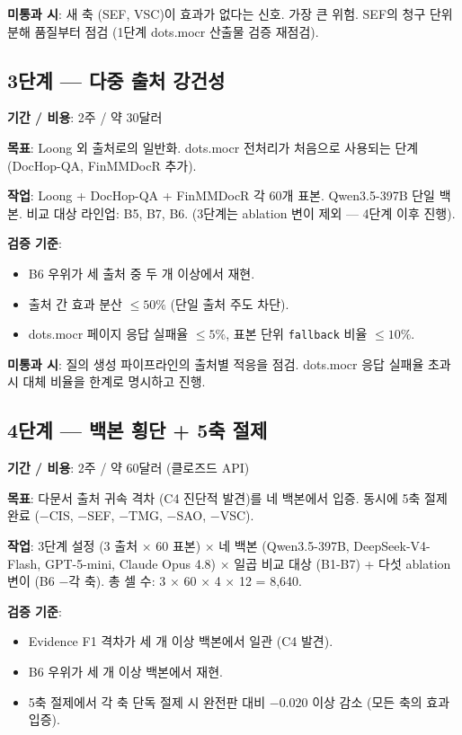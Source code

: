 \documentclass[11pt]{article}
\begin{document}
\textbf{미통과 시}: 새 축 (SEF, VSC)이 효과가 없다는 신호. 가장 큰 위험. SEF의 청구 단위 분해 품질부터 점검 (1단계 dots.mocr 산출물 검증 재점검).

\subsection{3단계 — 다중 출처 강건성}

\textbf{기간 / 비용}: 2주 / 약 30달러

\textbf{목표}: Loong 외 출처로의 일반화. dots.mocr 전처리가 처음으로 사용되는 단계 (DocHop-QA, FinMMDocR 추가).

\textbf{작업}: Loong + DocHop-QA + FinMMDocR 각 60개 표본. Qwen3.5-397B 단일 백본. 비교 대상 라인업: B5, B7, B6. (3단계는 ablation 변이 제외 — 4단계 이후 진행).

\textbf{검증 기준}:
\begin{itemize}[leftmargin=*]
    \item B6 우위가 세 출처 중 두 개 이상에서 재현.
    \item 출처 간 효과 분산 $\leq 50\%$ (단일 출처 주도 차단).
    \item dots.mocr 페이지 응답 실패율 $\leq 5\%$, 표본 단위 \texttt{fallback} 비율 $\leq 10\%$.
\end{itemize}

\textbf{미통과 시}: 질의 생성 파이프라인의 출처별 적응을 점검. dots.mocr 응답 실패율 초과 시 대체 비율을 한계로 명시하고 진행.

\subsection{4단계 — 백본 횡단 + 5축 절제}

\textbf{기간 / 비용}: 2주 / 약 60달러 (클로즈드 API)

\textbf{목표}: 다문서 출처 귀속 격차 (C4 진단적 발견)를 네 백본에서 입증. 동시에 5축 절제 완료 (−CIS, −SEF, −TMG, −SAO, −VSC).

\textbf{작업}: 3단계 설정 (3 출처 × 60 표본) × 네 백본 (Qwen3.5-397B, DeepSeek-V4-Flash, GPT-5-mini, Claude Opus 4.8) × 일곱 비교 대상 (B1-B7) + 다섯 ablation 변이 (B6 −각 축). 총 셀 수: 3 × 60 × 4 × 12 = 8,640.

\textbf{검증 기준}:
\begin{itemize}[leftmargin=*]
    \item Evidence F1 격차가 세 개 이상 백본에서 일관 (C4 발견).
    \item B6 우위가 세 개 이상 백본에서 재현.
    \item 5축 절제에서 각 축 단독 절제 시 완전판 대비 $-0.020$ 이상 감소 (모든 축의 효과 입증).
\end{itemize}
\end{document}

